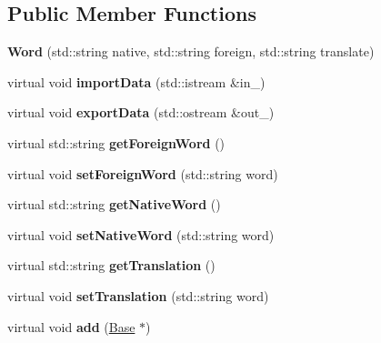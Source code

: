 \subsection*{Public Member Functions}
\begin{DoxyCompactItemize}
\item 
\mbox{\label{class_word_aa7eab6629fdbc794f379ff7d1746979e}} 
{\bfseries Word} (std\+::string native, std\+::string foreign, std\+::string translate)
\item 
\mbox{\label{class_word_a1e082803fada1b99cce469604fa5e4b4}} 
virtual void {\bfseries import\+Data} (std\+::istream \&in\+\_\+)
\item 
\mbox{\label{class_word_ae70c9ade266f84482e7bb1aeaafccb3b}} 
virtual void {\bfseries export\+Data} (std\+::ostream \&out\+\_\+)
\item 
\mbox{\label{class_word_a89e6bd6b32eee3266752bdea037c7c2f}} 
virtual std\+::string {\bfseries get\+Foreign\+Word} ()
\item 
\mbox{\label{class_word_a8ec142e06e4a361a898bb13aef837e6d}} 
virtual void {\bfseries set\+Foreign\+Word} (std\+::string word)
\item 
\mbox{\label{class_word_ad5b593288cc4b6db9e905751308a396b}} 
virtual std\+::string {\bfseries get\+Native\+Word} ()
\item 
\mbox{\label{class_word_a35bf10ad12dbe48a30a6a8b2f96b2dc5}} 
virtual void {\bfseries set\+Native\+Word} (std\+::string word)
\item 
\mbox{\label{class_word_a167500076ba8a742ae6cad5dc1507361}} 
virtual std\+::string {\bfseries get\+Translation} ()
\item 
\mbox{\label{class_word_ad583dd58318ebc7be4d5e02bcf173191}} 
virtual void {\bfseries set\+Translation} (std\+::string word)
\item 
\mbox{\label{class_word_a182a4223aab6094d670166a8e3fdd8c0}} 
virtual void {\bfseries add} (\mbox{\hyperlink{class_base}{Base}} $\ast$)
\end{DoxyCompactItemize}
